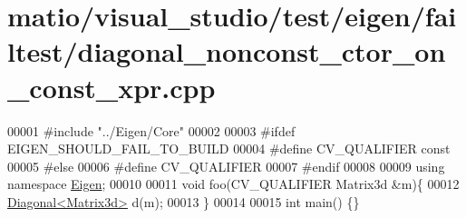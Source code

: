 \hypertarget{matio_2visual__studio_2test_2eigen_2failtest_2diagonal__nonconst__ctor__on__const__xpr_8cpp_source}{}\section{matio/visual\+\_\+studio/test/eigen/failtest/diagonal\+\_\+nonconst\+\_\+ctor\+\_\+on\+\_\+const\+\_\+xpr.cpp}
\label{matio_2visual__studio_2test_2eigen_2failtest_2diagonal__nonconst__ctor__on__const__xpr_8cpp_source}

\begin{DoxyCode}
00001 \textcolor{preprocessor}{#include "../Eigen/Core"}
00002 
00003 \textcolor{preprocessor}{#ifdef EIGEN\_SHOULD\_FAIL\_TO\_BUILD}
00004 \textcolor{preprocessor}{#define CV\_QUALIFIER const}
00005 \textcolor{preprocessor}{#else}
00006 \textcolor{preprocessor}{#define CV\_QUALIFIER}
00007 \textcolor{preprocessor}{#endif}
00008 
00009 \textcolor{keyword}{using namespace }\hyperlink{namespace_eigen}{Eigen};
00010 
00011 \textcolor{keywordtype}{void} foo(CV\_QUALIFIER Matrix3d &m)\{
00012     \hyperlink{group___core___module_class_eigen_1_1_diagonal}{Diagonal<Matrix3d>} d(m);
00013 \}
00014 
00015 \textcolor{keywordtype}{int} main() \{\}
\end{DoxyCode}
